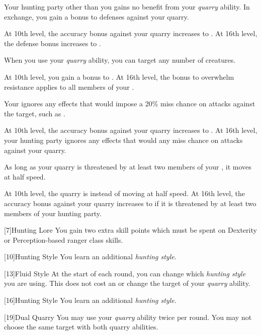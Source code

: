 {            
            Your hunting party other than you gains no benefit from your \textit{quarry} ability.
            In exchange, you gain a  bonus to defenses against your quarry.
            \par At 10th level, the accuracy bonus against your quarry increases to .
            At 16th level, the defense bonus increases to .

            When you use your \textit{quarry} ability, you can target any number of creatures.
            \par At 10th level, you gain a  bonus to .
            At 16th level, the bonus to overwhelm resistance applies to all members of your .

            Your  ignores any effects that would impose a 20\% miss chance on attacks against the target, such as .
            \par At 10th level, the accuracy bonus against your quarry increases to .
            At 16th level, your hunting party ignores any effects that would any miss chance on attacks against your quarry.

            As long as your quarry is threatened by at least two members of your , it moves at half speed.
            \par At 10th level, the quarry is \immobilized instead of moving at half speed.
            At 16th level, the accuracy bonus against your quarry increases to  if it is threatened by at least two members of your hunting party.
        }

        [7]{Hunting Lore} You gain two extra skill points which must be spent on Dexterity or Perception-based ranger class skills.

        [10]{Hunting Style}
        You learn an additional \textit{hunting style}.

        [13]{Fluid Style}
        At the start of each round, you can change which \textit{hunting style} you are using.
        This does not cost an  or change the target of your \textit{quarry} ability.

        [16]{Hunting Style}
        You learn an additional \textit{hunting style}.

        [19]{Dual Quarry} You may use your \textit{quarry} ability twice per round.
        You may not choose the same target with both quarry abilities.

